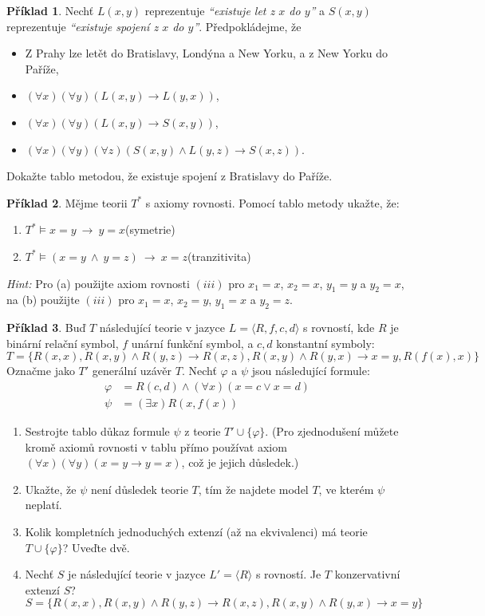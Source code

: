 \documentclass[a4paper]{article}
\theoremstyle{plain}
\theoremstyle{definition}
\newtheorem{problem}{Příklad}
\begin{document}
    
\medskip\begin{problem} Nechť $L(x,y)$ reprezentuje \emph{``existuje let z $x$ do $y$''} a $S(x,y)$ reprezentuje \emph{``existuje spojení z $x$ do $y$''}. Předpokládejme, že
    \begin{itemize}  
    \item Z Prahy lze letět do Bratislavy, Londýna a New Yorku, a z New Yorku do Paříže,
    \item $(\forall x)(\forall y)(L(x,y) \to L(y,x))$,
    \item $(\forall x)(\forall y)(L(x,y)\to S(x,y))$,
    \item $(\forall x)(\forall y)(\forall z)(S(x,y)\wedge L(y,z)\to S(x,z))$.
    \end{itemize}
    Dokažte tablo metodou, že existuje spojení z Bratislavy do Paříže.
\end{problem}


\medskip\begin{problem} Mějme teorii $T^*$ s axiomy rovnosti. Pomocí tablo metody ukažte, že:
\begin{enumerate} 
    \item $T^*\models x=y\ \to\ y=x$\hfill(symetrie)
    \item $T^*\models (x=y\ \wedge\ y=z)\ \to\ x=z$\hfill(tranzitivita)
\end{enumerate}
{\it Hint:} Pro (a) použijte axiom rovnosti $(iii)$ pro $x_1=x$, $x_2=x$, $y_1=y$ a $y_2=x$, \newline
    na (b) použijte $(iii)$ pro $x_1=x$, $x_2=y$, $y_1=x$ a $y_2=z$.
\end{problem}


\medskip\begin{problem} 
Buď $T$ následující teorie v jazyce $L=\langle R,f,c,d\rangle$ s rovností, kde $R$ je binární relační symbol,  $f$ unární funkční symbol, a $c,d$ konstantní symboly:
$$
T=\{R(x,x),R(x,y)\wedge R(y,z)\to R(x,z),R(x,y)\wedge R(y,x)\to x=y,R(f(x),x)\}
$$
Označme jako $T'$ generální uzávěr $T$. Nechť $\varphi$ a $\psi$ jsou následující formule:
\begin{align*}
    \varphi &= R(c,d) \wedge (\forall x)(x=c\vee x=d)\\
    \psi &= (\exists x)R(x,f(x))
\end{align*}
\begin{enumerate}
    \item Sestrojte tablo důkaz formule $\psi$ z teorie $T'\cup\{\varphi\}$. (Pro zjednodušení můžete kromě axiomů rovnosti v tablu přímo používat axiom $(\forall x)(\forall y)(x=y\to y=x)$, což je jejich důsledek.)
    \item Ukažte, že $\psi$ není důsledek teorie $T$, tím že najdete model $T$, ve kterém $\psi$ neplatí.
    \item Kolik kompletních jednoduchých extenzí (až na ekvivalenci) má teorie $T\cup \{\varphi\}$? Uveďte dvě.
    \item Nechť $S$ je následující teorie v jazyce $L'=\langle R\rangle$ s rovností. Je $T$ konzervativní extenzí $S$?
     $$S=\{R(x,x),R(x,y)\wedge R(y,z)\to R(x,z),R(x,y)\wedge R(y,x)\to x=y\}$$     
\end{enumerate}
\end{problem}
\end{document}
